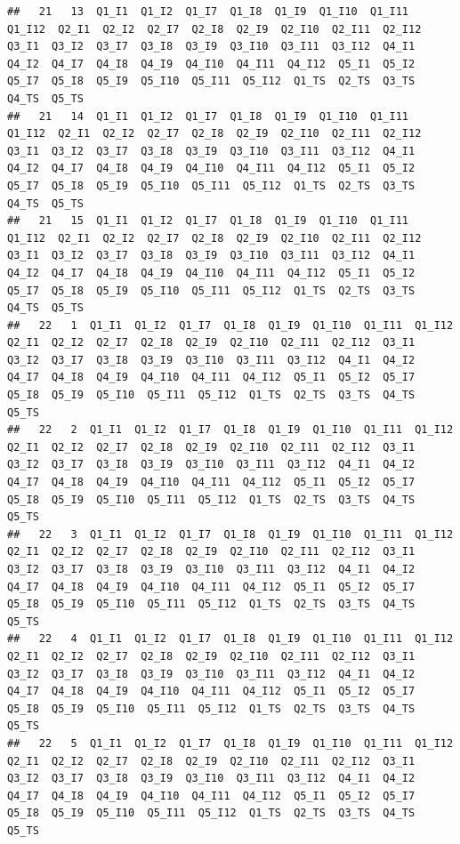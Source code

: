 \documentclass[
]{book}
\begin{document}
\begin{verbatim}
##   21   13  Q1_I1  Q1_I2  Q1_I7  Q1_I8  Q1_I9  Q1_I10  Q1_I11  Q1_I12  Q2_I1  Q2_I2  Q2_I7  Q2_I8  Q2_I9  Q2_I10  Q2_I11  Q2_I12  Q3_I1  Q3_I2  Q3_I7  Q3_I8  Q3_I9  Q3_I10  Q3_I11  Q3_I12  Q4_I1  Q4_I2  Q4_I7  Q4_I8  Q4_I9  Q4_I10  Q4_I11  Q4_I12  Q5_I1  Q5_I2  Q5_I7  Q5_I8  Q5_I9  Q5_I10  Q5_I11  Q5_I12  Q1_TS  Q2_TS  Q3_TS  Q4_TS  Q5_TS
##   21   14  Q1_I1  Q1_I2  Q1_I7  Q1_I8  Q1_I9  Q1_I10  Q1_I11  Q1_I12  Q2_I1  Q2_I2  Q2_I7  Q2_I8  Q2_I9  Q2_I10  Q2_I11  Q2_I12  Q3_I1  Q3_I2  Q3_I7  Q3_I8  Q3_I9  Q3_I10  Q3_I11  Q3_I12  Q4_I1  Q4_I2  Q4_I7  Q4_I8  Q4_I9  Q4_I10  Q4_I11  Q4_I12  Q5_I1  Q5_I2  Q5_I7  Q5_I8  Q5_I9  Q5_I10  Q5_I11  Q5_I12  Q1_TS  Q2_TS  Q3_TS  Q4_TS  Q5_TS
##   21   15  Q1_I1  Q1_I2  Q1_I7  Q1_I8  Q1_I9  Q1_I10  Q1_I11  Q1_I12  Q2_I1  Q2_I2  Q2_I7  Q2_I8  Q2_I9  Q2_I10  Q2_I11  Q2_I12  Q3_I1  Q3_I2  Q3_I7  Q3_I8  Q3_I9  Q3_I10  Q3_I11  Q3_I12  Q4_I1  Q4_I2  Q4_I7  Q4_I8  Q4_I9  Q4_I10  Q4_I11  Q4_I12  Q5_I1  Q5_I2  Q5_I7  Q5_I8  Q5_I9  Q5_I10  Q5_I11  Q5_I12  Q1_TS  Q2_TS  Q3_TS  Q4_TS  Q5_TS
##   22   1  Q1_I1  Q1_I2  Q1_I7  Q1_I8  Q1_I9  Q1_I10  Q1_I11  Q1_I12  Q2_I1  Q2_I2  Q2_I7  Q2_I8  Q2_I9  Q2_I10  Q2_I11  Q2_I12  Q3_I1  Q3_I2  Q3_I7  Q3_I8  Q3_I9  Q3_I10  Q3_I11  Q3_I12  Q4_I1  Q4_I2  Q4_I7  Q4_I8  Q4_I9  Q4_I10  Q4_I11  Q4_I12  Q5_I1  Q5_I2  Q5_I7  Q5_I8  Q5_I9  Q5_I10  Q5_I11  Q5_I12  Q1_TS  Q2_TS  Q3_TS  Q4_TS  Q5_TS
##   22   2  Q1_I1  Q1_I2  Q1_I7  Q1_I8  Q1_I9  Q1_I10  Q1_I11  Q1_I12  Q2_I1  Q2_I2  Q2_I7  Q2_I8  Q2_I9  Q2_I10  Q2_I11  Q2_I12  Q3_I1  Q3_I2  Q3_I7  Q3_I8  Q3_I9  Q3_I10  Q3_I11  Q3_I12  Q4_I1  Q4_I2  Q4_I7  Q4_I8  Q4_I9  Q4_I10  Q4_I11  Q4_I12  Q5_I1  Q5_I2  Q5_I7  Q5_I8  Q5_I9  Q5_I10  Q5_I11  Q5_I12  Q1_TS  Q2_TS  Q3_TS  Q4_TS  Q5_TS
##   22   3  Q1_I1  Q1_I2  Q1_I7  Q1_I8  Q1_I9  Q1_I10  Q1_I11  Q1_I12  Q2_I1  Q2_I2  Q2_I7  Q2_I8  Q2_I9  Q2_I10  Q2_I11  Q2_I12  Q3_I1  Q3_I2  Q3_I7  Q3_I8  Q3_I9  Q3_I10  Q3_I11  Q3_I12  Q4_I1  Q4_I2  Q4_I7  Q4_I8  Q4_I9  Q4_I10  Q4_I11  Q4_I12  Q5_I1  Q5_I2  Q5_I7  Q5_I8  Q5_I9  Q5_I10  Q5_I11  Q5_I12  Q1_TS  Q2_TS  Q3_TS  Q4_TS  Q5_TS
##   22   4  Q1_I1  Q1_I2  Q1_I7  Q1_I8  Q1_I9  Q1_I10  Q1_I11  Q1_I12  Q2_I1  Q2_I2  Q2_I7  Q2_I8  Q2_I9  Q2_I10  Q2_I11  Q2_I12  Q3_I1  Q3_I2  Q3_I7  Q3_I8  Q3_I9  Q3_I10  Q3_I11  Q3_I12  Q4_I1  Q4_I2  Q4_I7  Q4_I8  Q4_I9  Q4_I10  Q4_I11  Q4_I12  Q5_I1  Q5_I2  Q5_I7  Q5_I8  Q5_I9  Q5_I10  Q5_I11  Q5_I12  Q1_TS  Q2_TS  Q3_TS  Q4_TS  Q5_TS
##   22   5  Q1_I1  Q1_I2  Q1_I7  Q1_I8  Q1_I9  Q1_I10  Q1_I11  Q1_I12  Q2_I1  Q2_I2  Q2_I7  Q2_I8  Q2_I9  Q2_I10  Q2_I11  Q2_I12  Q3_I1  Q3_I2  Q3_I7  Q3_I8  Q3_I9  Q3_I10  Q3_I11  Q3_I12  Q4_I1  Q4_I2  Q4_I7  Q4_I8  Q4_I9  Q4_I10  Q4_I11  Q4_I12  Q5_I1  Q5_I2  Q5_I7  Q5_I8  Q5_I9  Q5_I10  Q5_I11  Q5_I12  Q1_TS  Q2_TS  Q3_TS  Q4_TS  Q5_TS

\end{verbatim}
\end{document}
